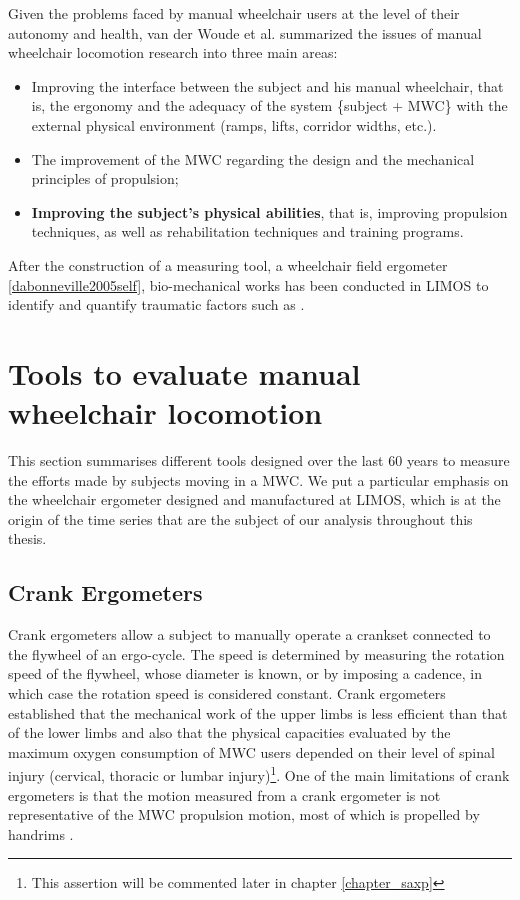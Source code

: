 Given the problems faced by manual wheelchair users at the level of
their autonomy and health, van der Woude et al. \cite{van2005wheelchair} \cite{woude1986wheelchair} summarized the issues of manual wheelchair locomotion research into three main areas:

\begin{itemize}
\item Improving the interface between the subject and his manual wheelchair, that is, the ergonomy and the adequacy of the system \{subject + MWC\} with the external physical environment (ramps, lifts, corridor widths, etc.).
\item The improvement of the MWC regarding the design and the mechanical principles of propulsion;
\item \textbf{Improving the subject's physical abilities}, that is, improving propulsion techniques, as well as rehabilitation techniques and training programs.
\end{itemize}

After the construction of a measuring tool,  a wheelchair field ergometer \ref{dabonneville2005self},  bio-mechanical works has been conducted in LIMOS to identify and quantify traumatic factors such as \cite{Remy2005}  \cite{Sauret2010}. 

\section[Evaluation tools]{Tools to evaluate manual wheelchair locomotion}
\label{measurment_tools}
This section summarises different tools designed over the last 60 years to measure the efforts made by subjects moving in a MWC. We put a  particular emphasis on the wheelchair  ergometer designed and manufactured at LIMOS, which is at the origin of the time series that are the subject of our analysis throughout this thesis.

\subsection{Crank Ergometers}
Crank ergometers allow a subject to manually operate a crankset connected to the flywheel of an ergo-cycle. The speed is determined by measuring the rotation speed of the flywheel, whose diameter is known, or by imposing a cadence, in which case the rotation speed is considered constant. Crank ergometers established that the mechanical work of the upper limbs is less efficient than that of the lower limbs and also that the physical capacities evaluated by the maximum oxygen consumption of MWC users depended on their level of spinal injury (cervical, thoracic or lumbar injury)\footnote{This assertion will be commented later in chapter \ref{chapter_saxp}}. One of the main limitations of crank ergometers is that the motion measured from a crank ergometer is not representative of the MWC propulsion motion, most of which is propelled by handrims \cite{0aastrand1961maximal}  \cite{bergh1976maximal}    \cite{stenberg1967hemodynamic}.

